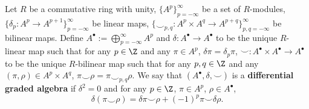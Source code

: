 \begin{definition}
  Let
    $R$ be a commutative ring with unity,
    $\{A^p\}_{p = -\infty}^\infty$ be a set of $R$-modules,
    $\{\delta_p \colon A^p \to A^{p + 1}\}_{p = -\infty}^\infty$ be linear
      maps,
    $\{\smile_{p, q} \colon
      A^p \times A^q \to A^{p + q}\}_{p, q = - \infty}^\infty$
      be bilinear maps.
  Define
    $A^\bullet := \bigoplus_{p = -\infty}^\infty A^p$ and
    $\delta \colon A^\bullet \to A^\bullet$ to be the unique $R$-linear map
      such that for any $p \in \Z$ and any $\pi \in A^p$,
      $\delta \pi = \delta_p \pi$,
    $\smile \colon A^\bullet \times A^\bullet \to A^\bullet$ to be the unique
    $R$-bilinear map
      such that for any $p, q \in \Z$ and any $(\pi, \rho) \in A^p \times A^q$,
      $\pi \smile \rho = \pi \smile_{p, q} \rho$.
  We say that $(A^\bullet, \delta, \smile)$ is a
  \textbf{differential graded algebra} if
  $\delta^2 = 0$ and for any $p \in \Z$, $\pi \in A^p$, $\rho \in A^\bullet$,
  \begin{equation}
    \delta(\pi \smile \rho)
    = \delta \pi \smile \rho + (-1)^p \pi \smile \delta \rho.
  \end{equation}
\end{definition}
